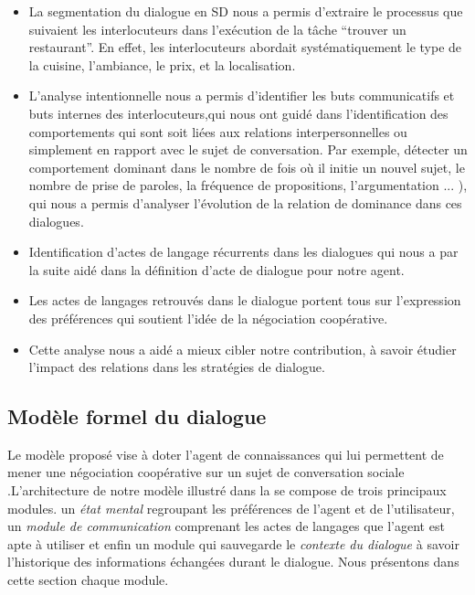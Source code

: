 \documentclass[a4paper,french]{article}
\begin{document}
\begin{itemize}

		\item  La segmentation du dialogue en SD nous a permis d'extraire le processus que suivaient les interlocuteurs dans l'exécution de la tâche  ``trouver un restaurant''. En effet, les interlocuteurs abordait systématiquement le type de la cuisine, l'ambiance, le prix, et la localisation. 
		
		\item L'analyse intentionnelle nous a permis d'identifier les buts communicatifs et buts internes des interlocuteurs,qui nous ont guidé dans l'identification des comportements qui sont soit liées aux relations interpersonnelles ou simplement en rapport avec le sujet de conversation. Par exemple, détecter un comportement dominant dans le nombre de fois où il initie un nouvel sujet, le nombre de prise de paroles, la fréquence de propositions, l'argumentation ... ), qui nous a permis d'analyser l'évolution de la relation de dominance dans ces dialogues. 
		\item Identification d'actes de langage récurrents dans les dialogues qui nous a par la suite aidé dans la définition d'acte de dialogue pour notre agent.	
		\item Les actes de langages retrouvés dans le dialogue portent tous sur l'expression des préférences qui soutient l'idée de la négociation coopérative.
		\item Cette analyse nous a aidé a mieux cibler notre contribution, à savoir étudier l'impact des relations dans les stratégies de dialogue.

	
	
\end{itemize}


\subsection{Modèle formel du dialogue}
\par Le modèle proposé vise à doter l'agent de connaissances qui lui permettent de mener une négociation coopérative sur un sujet de conversation sociale
.L'architecture de notre modèle illustré dans la  se compose de trois principaux modules. un \textit{état mental} regroupant les préférences de l'agent et de l'utilisateur, un \textit{module de communication} comprenant les actes de langages que l'agent est apte à utiliser et enfin un module qui sauvegarde le \textit{contexte du dialogue} à savoir l'historique des informations échangées durant le dialogue. Nous présentons dans cette section chaque module.
\end{document}

